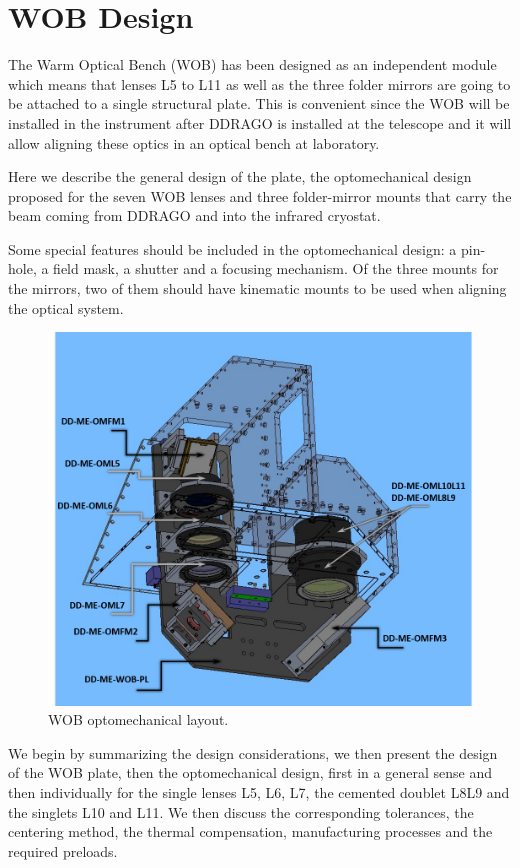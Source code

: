 \documentclass{report}
\begin{document}
\chapter{WOB Design}

The Warm Optical Bench (WOB) has been designed as an independent module which means that lenses L5 to L11 as well as the three folder mirrors are going to be attached to a single structural plate. This is convenient since the WOB will be installed in the instrument after DDRAGO is installed at the telescope and it will allow aligning these optics in an optical bench at laboratory.

Here we describe the general design of the plate, the optomechanical design proposed for the seven WOB lenses and three folder-mirror mounts that carry the beam coming from DDRAGO and into the infrared cryostat.

Some special features should be included in the optomechanical design: a pin-hole, a field mask, a shutter and a focusing mechanism. Of the three mounts for the mirrors, two of them should have kinematic mounts to be used when aligning the optical system.

\begin{figure}
\begin{center}
\includegraphics[width=0.7\linewidth]{figures/WOB_layout.png}
\end{center}
\caption{WOB optomechanical layout.}
\label{figure:WOB-LO}
\end{figure}

We begin by summarizing the design considerations, we then present the design of the WOB plate, then the optomechanical design, first in a general sense and then individually for the single lenses L5, L6, L7, the cemented doublet L8L9 and the singlets L10 and L11. We then discuss the corresponding tolerances, the centering method, the thermal compensation, manufacturing processes and the required preloads.
\end{document}
